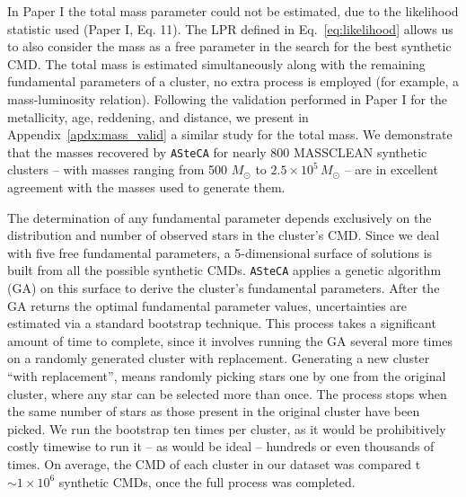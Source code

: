 \documentclass[draft]{aa}
\begin{document}
%
In Paper I the total mass parameter could not be estimated, due to the
likelihood statistic used (Paper I, Eq. 11). The LPR defined in
Eq.~\ref{eq:likelihood} allows us to also consider the mass as a free parameter
in the search for the best synthetic CMD.\@
%
The total mass is estimated simultaneously along with the remaining
fundamental parameters of a cluster, no extra process is employed (for example,
a mass-luminosity relation).
%
Following the validation performed in Paper I for the metallicity, age,
reddening, and distance, we present in Appendix~\ref{apdx:mass_valid} a
similar study for the total mass. We demonstrate that the masses recovered by
\texttt{ASteCA} for nearly 800 MASSCLEAN synthetic clusters -- with
masses ranging from 500 $M_{\odot}$ to $2.5\times10^5\,M_{\odot}$ -- are in
excellent agreement with the masses used to generate them.

The determination of any fundamental parameter depends exclusively on
the distribution and number of observed stars in the cluster's CMD.\@
Since we deal with five free fundamental parameters, a 5-dimensional surface of
solutions is built from all the possible synthetic CMDs.
\texttt{ASteCA} applies a genetic algorithm (GA) on this surface to derive the
cluster's fundamental parameters.
%
%
After the GA returns the optimal fundamental parameter values, uncertainties are
estimated via a standard bootstrap technique. This process takes a significant
amount of time to complete, since it involves running the GA several more times
on a randomly generated cluster with replacement. Generating a new
cluster ``with replacement'', means randomly picking stars one by one from the
original cluster, where any star can be selected more than once. The process
stops when the same number of stars as those present in the original cluster
have been picked.
We run the bootstrap ten times per cluster, as it would be prohibitively
costly timewise to run it -- as would be ideal -- hundreds or even thousands of
times.
On average, the CMD of each cluster in our dataset was compared t
${\sim}1{\times}10^6$ synthetic CMDs, once the full process was completed.
\end{document}
